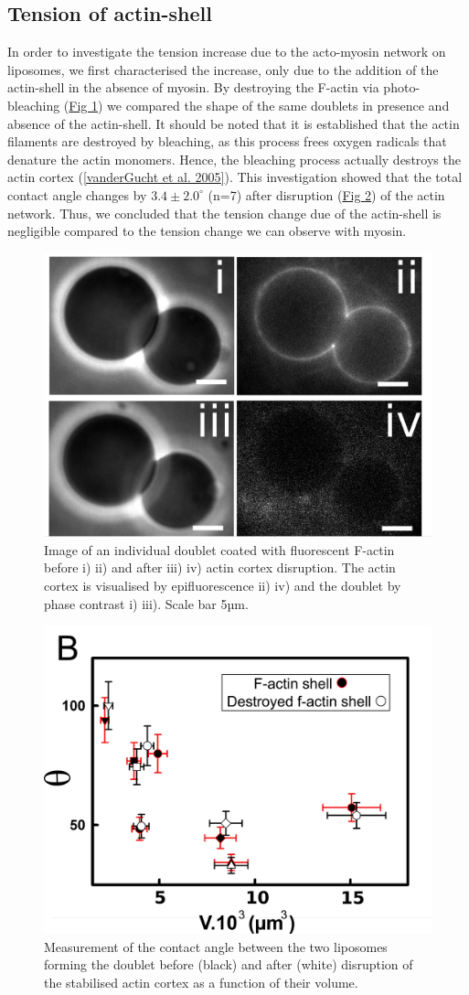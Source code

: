 \documentclass[A4paperpaper,11pt,english]{sphinxmanual}
\begin{document}
\subsection{Tension of actin-shell}
\label{index-latex:tension-of-actin-shell}
In order to investigate the tension increase due to the acto-myosin network
on liposomes, we first characterised the increase, only due to the addition of the actin-shell in
the absence of myosin. By destroying the F-actin via photo-bleaching (\hyperref[index-latex:fig2a]{Fig  \ref*{index-latex:fig2a}}) we compared the shape of the
same doublets in presence and absence of the actin-shell. It should be noted that it is established that the
actin filaments are destroyed by bleaching, as this process frees oxygen radicals that denature the actin monomers. Hence, the bleaching process
actually destroys the actin cortex ({\hyperref[index-latex:vandergucht2005]{{[}vanderGucht et al. 2005{]}}}).
This investigation showed that the total contact
angle changes by \(3.4 \pm 2.0 ^{\circ}\) (n=7) after disruption (\hyperref[index-latex:fig2b]{Fig  \ref*{index-latex:fig2b}}) of the actin network.
Thus, we concluded that the tension change due of the actin-shell is negligible
compared to the tension change we can observe with myosin.
\begin{figure}[htbp]
\centering
\capstart

\includegraphics[width=0.500\linewidth]{Fig_02-A.png}
\caption{Image of an individual doublet coated with fluorescent F-actin before i) ii) and
after iii) iv) actin cortex disruption. The actin cortex is visualised by
epifluorescence ii) iv) and the doublet by phase contrast i) iii). Scale
bar 5µm.}\label{index-latex:fig2a}\end{figure}
\begin{figure}[htbp]
\centering
\capstart

\includegraphics[width=0.500\linewidth]{Fig_02-B.png}
\caption{Measurement of the contact angle between the two liposomes forming the
doublet before (black) and after (white) disruption of the stabilised actin
cortex as a function of their volume.}\label{index-latex:fig2b}\end{figure}
\end{document}
